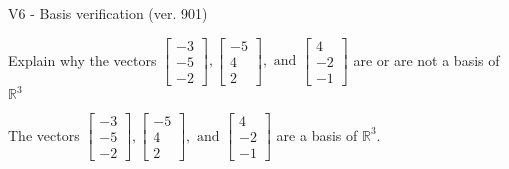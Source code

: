 \begin{exercise}
  \begin{exerciseTitle}V6 - Basis verification (ver. 901)\end{exerciseTitle}
  \begin{exerciseStatement}
    Explain why the vectors \(\left[\begin{array}{r}
-3 \\
-5 \\
-2
\end{array}\right] , \left[\begin{array}{r}
-5 \\
4 \\
2
\end{array}\right] , \text{ and } \left[\begin{array}{r}
4 \\
-2 \\
-1
\end{array}\right]\) are or are not a basis of \(\mathbb{R}^3\)	


  \end{exerciseStatement}
  \begin{exerciseAnswer}
   The vectors \(\left[\begin{array}{r}
-3 \\
-5 \\
-2
\end{array}\right] , \left[\begin{array}{r}
-5 \\
4 \\
2
\end{array}\right] , \text{ and } \left[\begin{array}{r}
4 \\
-2 \\
-1
\end{array}\right]\) 
  	 are  a basis of \(\mathbb{R}^3\).
  


  \end{exerciseAnswer}
\end{exercise}